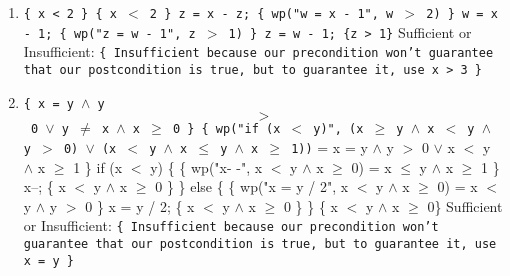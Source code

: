 \documentclass[11pt]{article}
\begin{document}
\begin{enumerate}
\item \texttt{\{ x < 2 \}
\newline
\hspace*{0.5cm}\{ x $<$ 2 \} %
\newline
z = x - z;
\newline
\hspace*{0.5cm}\{ wp("w = x - 1", w $>$ 2) \}
\newline
w = x - 1;
\newline
\hspace*{0.5cm}\{ wp("z = w - 1", z $>$ 1) \}
\newline
z = w - 1;
\newline
\{z > 1\}}
\newline
Sufficient or Insufficient: \texttt{\{ Insufficient because our precondition won't guarantee that our postcondition is true, but to guarantee it, use x > 3 \}} %

\item \texttt{\{ x = y $\land$ y $$>$$ 0 $\lor$ y $\neq$ x $\land$ x $\ge$ 0 \}
\newline
\hspace*{0.5cm}
\{ wp("if (x $<$ y)", (x $\geq$ y $\wedge$ x $<$ y $\wedge$ y $>$ 0) $\vee$ (x $<$ y $\wedge$ x $\leq$ y $\wedge$ x $\geq$ 1))} = { x = y $\wedge$ y $>$ 0 $\vee$ x $<$ y $\wedge$ x $\geq$ 1  \}
\newline
if (x $<$ y) \{
\newline
\hspace*{1cm}\{ wp("x- -", x $<$ y $\wedge$ x $\geq$ 0) } = { x $\leq$ y $\wedge$ x $\geq$ 1 \}
\newline
\hspace*{0.5cm}x--;
\newline
\hspace*{1cm}\{ x $<$ y $\wedge$ x $\geq$ 0  \}
\newline
\} else \{
\newline
\hspace*{1cm}\{ wp("x = y / 2", x $<$ y $\wedge$ x $\geq$ 0) } = { x $<$ y $\wedge$ y $>$ 0 \}
\newline
\hspace*{0.5cm}x = y / 2;
\newline
\hspace*{1cm}\{ x $<$ y $\wedge$ x $\geq$ 0 \}
\newline
\}
\newline
\{ x $<$ y $\land$ x $\ge$ 0\}}
\newline
Sufficient or Insufficient: \texttt{\{ Insufficient because our precondition won't guarantee that our postcondition is true, but to guarantee it, use x = y \}}
\end{enumerate}
\end{document}
